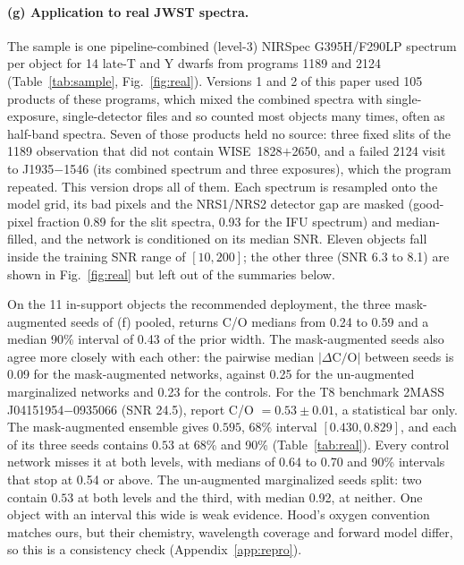 \documentclass{article}
\begin{document}
\paragraph{(g) Application to real JWST spectra.}
The sample is one pipeline-combined (level-3) NIRSpec G395H/F290LP spectrum per
object for 14 late-T and Y dwarfs from programs 1189 and 2124
(Table~\ref{tab:sample}, Fig.~\ref{fig:real}). Versions 1 and 2 of this paper
used 105 products of these programs, which mixed the combined spectra with
single-exposure, single-detector files and so counted most objects many times,
often as half-band spectra. Seven of those products held no source: three
fixed slits of the 1189 observation that did not contain WISE~1828$+$2650, and a
failed 2124 visit to J1935$-$1546 (its combined spectrum and three exposures),
which the program repeated. This version drops all of them. Each spectrum is
resampled onto the model grid, its bad pixels and the NRS1/NRS2 detector gap are
masked (good-pixel fraction 0.89 for the slit spectra, 0.93 for the IFU
spectrum) and median-filled, and the network is conditioned on its median SNR.
Eleven objects fall inside the training SNR range of $[10,200]$; the other three
(SNR 6.3 to 8.1) are shown in Fig.~\ref{fig:real} but left out of the summaries
below.

On the 11 in-support objects the recommended deployment, the three
mask-augmented seeds of (f) pooled, returns C/O medians from 0.24 to 0.59 and a
median 90\% interval of 0.43 of the prior width. The mask-augmented seeds also
agree more closely with each other: the pairwise median $|\Delta\mathrm{C/O}|$ between seeds is
0.09 for the mask-augmented networks, against 0.25 for the un-augmented
marginalized networks and 0.23 for the controls. For the T8 benchmark
2MASS J04151954$-$0935066 (SNR 24.5), \citet{hood2024} report C/O
$=0.53\pm0.01$, a statistical bar only. The mask-augmented ensemble gives
$0.595$, 68\% interval $[0.430,0.829]$, and each of its three seeds contains
$0.53$ at 68\% and 90\% (Table~\ref{tab:real}). Every control network misses it
at both levels, with medians of 0.64 to 0.70 and 90\% intervals that stop at
0.54 or above. The un-augmented marginalized seeds split: two contain $0.53$ at
both levels and the third, with median 0.92, at neither. One object with an
interval this wide is weak evidence. Hood's oxygen convention matches ours, but
their chemistry, wavelength coverage and forward model differ, so this is a
consistency check (Appendix~\ref{app:repro}).
\end{document}

